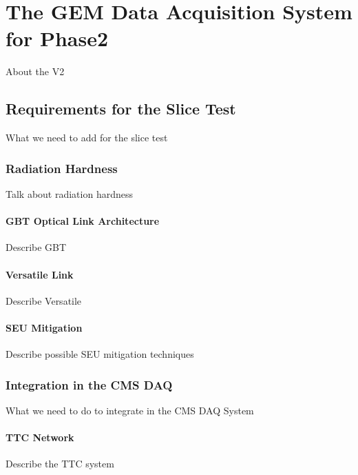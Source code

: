 \chapter{The GEM Data Acquisition System for Phase2}
\label{chap:phase2}

    About the V2

    \section{Requirements for the Slice Test}

        What we need to add for the slice test

        \subsection{Radiation Hardness}

            Talk about radiation hardness

            \subsubsection{GBT Optical Link Architecture}

                Describe GBT

            \subsubsection{Versatile Link}

                Describe Versatile

            \subsubsection{SEU Mitigation}

                Describe possible SEU mitigation techniques

        \subsection{Integration in the CMS DAQ}

            What we need to do to integrate in the CMS DAQ System

            \subsubsection{TTC Network}

                Describe the TTC system


